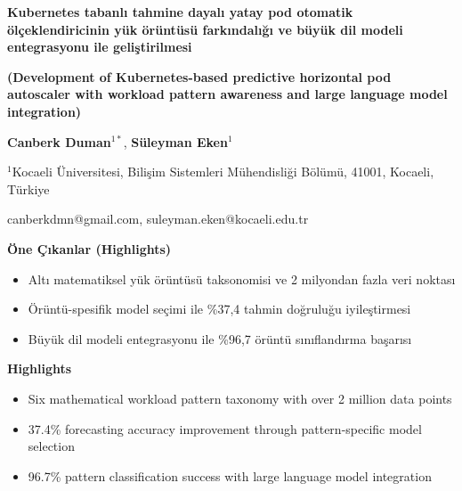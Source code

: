 \documentclass[12pt,a4paper]{article}
\begin{document}
\begin{center}
{\fontsize{14}{16}\selectfont\textbf{Kubernetes tabanlı tahmine dayalı yatay pod otomatik ölçeklendiricinin yük örüntüsü farkındalığı ve büyük dil modeli entegrasyonu ile geliştirilmesi}}

\vspace{0.5cm}

{\fontsize{14}{16}\selectfont\textbf{(Development of Kubernetes-based predictive horizontal pod autoscaler with workload pattern awareness and large language model integration)}}
\end{center}

\vspace{1cm}

\noindent
\textbf{Canberk Duman}$^{1*}$, \textbf{Süleyman Eken}$^{1}$

\vspace{0.5cm}

\noindent
$^{1}$Kocaeli Üniversitesi, Bilişim Sistemleri Mühendisliği Bölümü, 41001, Kocaeli, Türkiye

\vspace{0.5cm}

\noindent
canberkdmn@gmail.com, suleyman.eken@kocaeli.edu.tr

\vspace{1cm}

\noindent
\textbf{Öne Çıkanlar (Highlights)}

\begin{itemize}
    \item Altı matematiksel yük örüntüsü taksonomisi ve 2 milyondan fazla veri noktası
    \item Örüntü-spesifik model seçimi ile \%37,4 tahmin doğruluğu iyileştirmesi
    \item Büyük dil modeli entegrasyonu ile \%96,7 örüntü sınıflandırma başarısı
\end{itemize}

\vspace{0.5cm}

\noindent
\textbf{Highlights}

\begin{itemize}
    \item Six mathematical workload pattern taxonomy with over 2 million data points
    \item 37.4\% forecasting accuracy improvement through pattern-specific model selection
    \item 96.7\% pattern classification success with large language model integration
\end{itemize}
\end{document}
